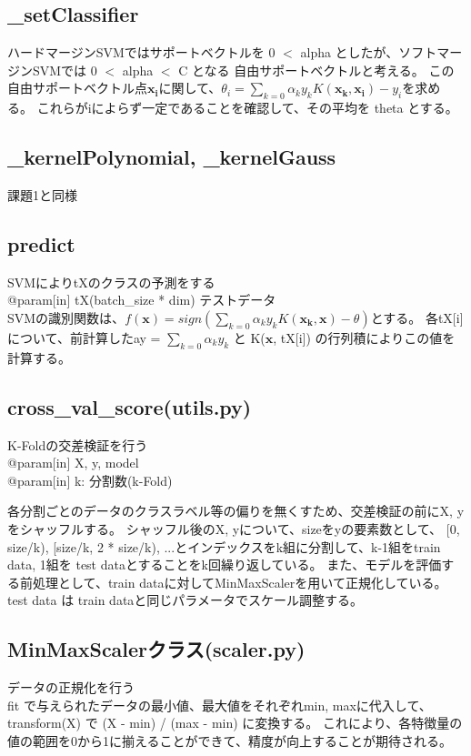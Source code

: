 \documentclass{jsarticle}
\begin{document}
\subsection{\_setClassifier}
ハードマージンSVMではサポートベクトルを 0 $<$ alpha としたが、ソフトマージンSVMでは 0 $<$ alpha $<$ C となる
自由サポートベクトルと考える。
この自由サポートベクトル点$\bm{x_i}$に関して、$\theta_i = \sum_{k=0} \alpha_k y_k K(\bm{x_k}, \bm{x_i}) - y_i$を求める。
これらがiによらず一定であることを確認して、その平均を theta とする。

\subsection*{\_kernelPolynomial, \_kernelGauss}
課題1と同様

\subsection*{predict}
SVMによりtXのクラスの予測をする \\
@param[in] tX(batch\_size * dim) テストデータ \\
SVMの識別関数は、$f(\bm{x}) = sign(\sum_{k=0} \alpha_k y_k K(\bm{x_k}, \bm{x}) - \theta)$とする。
各tX[i]について、前計算したay = $\sum_{k=0} \alpha_k y_k$ と K($\bm{x}$, tX[i]) の行列積によりこの値を計算する。

\subsection*{cross\_val\_score(utils.py)}
K-Foldの交差検証を行う \\
@param[in] X, y, model \\
@param[in] k: 分割数(k-Fold)

各分割ごとのデータのクラスラベル等の偏りを無くすため、交差検証の前にX, yをシャッフルする。
シャッフル後のX, yについて、sizeをyの要素数として、
[0, size/k), [size/k, 2 * size/k), ...とインデックスをk組に分割して、k-1組をtrain data, 1組を
test dataとすることをk回繰り返している。
また、モデルを評価する前処理として、train dataに対してMinMaxScalerを用いて正規化している。test data は
train dataと同じパラメータでスケール調整する。

\subsection*{MinMaxScalerクラス(scaler.py)}
データの正規化を行う \\
fit で与えられたデータの最小値、最大値をそれぞれmin, maxに代入して、
transform(X) で (X - min) / (max - min) に変換する。
これにより、各特徴量の値の範囲を0から1に揃えることができて、精度が向上することが期待される。
\end{document}
